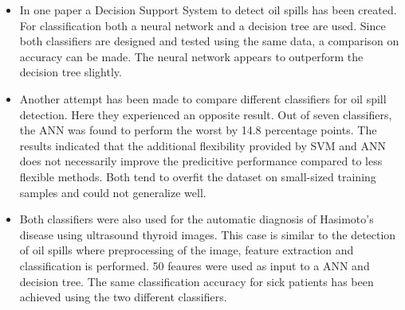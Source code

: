 \begin{itemize}
	
	\item  In one paper a Decision Support System to detect oil spills has been created. For classification both a neural network and a decision tree are used. Since both classifiers are designed and tested using the same data, a comparison on accuracy can be made. The neural network appears to outperform the decision tree slightly. \cite{Mera201472}
	
	\item  Another attempt has been made to compare different classifiers for oil spill detection.\cite{Xu201414} Here they experienced an opposite result. Out of seven classifiers, the ANN was found to perform the worst by 14.8 percentage points. The results indicated that the additional flexibility provided by SVM and ANN does not necessarily improve the predicitive performance compared to less flexible methods. Both tend to overfit the dataset on small-sized training samples and could not generalize well.
	
	\item Both classifiers were also used for the automatic diagnosis of Hasimoto's disease using ultrasound thyroid images\cite{Omiotek201340}. This case is similar to the detection of oil spills where preprocessing of the image, feature extraction and classification is performed. 50 feaures were used as input to a ANN and decision tree. The same classification accuracy for sick patients has been achieved using the two different classifiers.
    

\end{itemize}



	